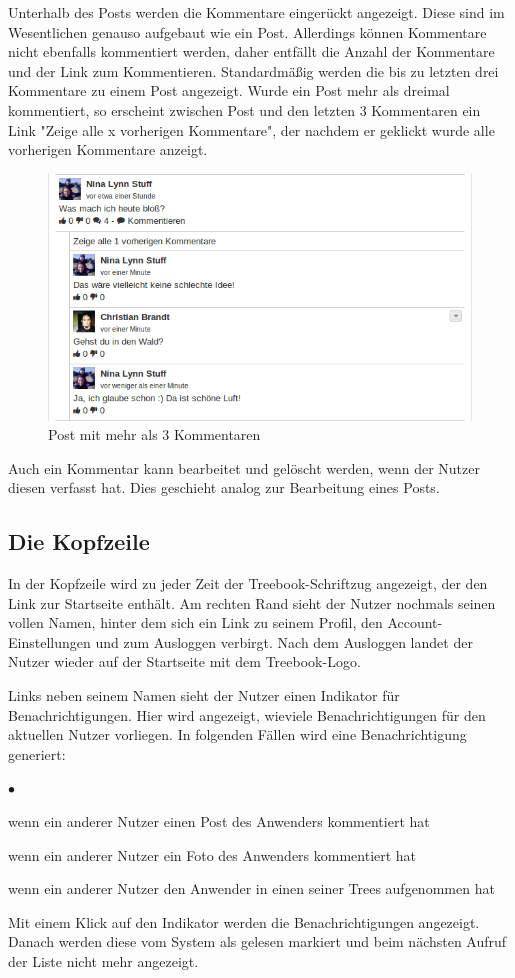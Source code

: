 \documentclass[10pt,a4paper]{book}
\makeatletter
\def\ScaleIfNeeded{%
\ifdim\Gin@nat@width>\linewidth
\linewidth
\else
\Gin@nat@width
\fi
}
\makeatother
\begin{document}
Unterhalb des Posts werden die Kommentare eingerückt angezeigt. Diese sind im Wesentlichen genauso aufgebaut wie ein Post. Allerdings können Kommentare nicht ebenfalls kommentiert werden, daher entfällt die Anzahl der Kommentare und der Link zum Kommentieren.
Standardmäßig werden die bis zu letzten drei Kommentare zu einem Post angezeigt. Wurde ein Post mehr als dreimal kommentiert, so erscheint zwischen Post und den letzten 3 Kommentaren ein Link "Zeige alle x vorherigen Kommentare", der nachdem er geklickt wurde alle vorherigen Kommentare anzeigt.
\begin{figure}[htbp]
\centering
\includegraphics[width=\ScaleIfNeeded]{Pictures/screen_post_and_comments.png}%
\caption{Post mit mehr als 3 Kommentaren}%
\end{figure}
Auch ein Kommentar kann bearbeitet und gelöscht werden, wenn der Nutzer diesen verfasst hat. Dies geschieht analog zur Bearbeitung eines Posts.

\subsection{Die Kopfzeile}
In der Kopfzeile wird zu jeder Zeit der Treebook-Schriftzug angezeigt, der den Link zur Startseite enthält. Am rechten Rand sieht der Nutzer nochmals seinen vollen Namen, hinter dem sich ein Link zu seinem Profil, den Account-Einstellungen und zum Ausloggen verbirgt.
Nach dem Ausloggen landet der Nutzer wieder auf der Startseite mit dem Treebook-Logo.

Links neben seinem Namen sieht der Nutzer einen Indikator für Benachrichtigungen. Hier wird angezeigt, wieviele Benachrichtigungen für den aktuellen Nutzer vorliegen. In folgenden Fällen wird eine Benachrichtigung generiert:
\begin{list}{$\bullet$}{}
\item wenn ein anderer Nutzer einen Post des Anwenders kommentiert hat
\item wenn ein anderer Nutzer ein Foto des Anwenders kommentiert hat
\item wenn ein anderer Nutzer den Anwender in einen seiner Trees aufgenommen hat
\end{list}
Mit einem Klick auf den Indikator werden die Benachrichtigungen angezeigt. Danach werden diese vom System als gelesen markiert und beim nächsten Aufruf der Liste nicht mehr angezeigt.
\end{document}
